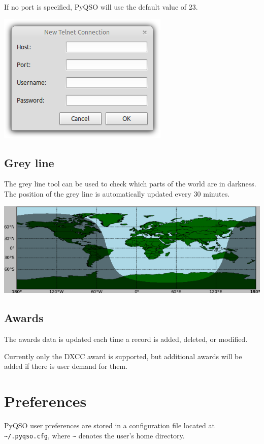 \documentclass[11pt, a4paper]{report}
\begin{document}

If no port is specified, PyQSO will use the default value of 23.

\begin{center}
  \includegraphics[width=0.5\columnwidth]{images/telnet_connection_dialog.png}
\end{center}

\section{Grey line}
The grey line tool can be used to check which parts of the world are in darkness. The position of the grey line is automatically updated every 30 minutes.

\begin{center}
  \includegraphics[width=1\columnwidth]{images/grey_line.png}
\end{center}

\section{Awards}
The awards data is updated each time a record is added, deleted, or modified. 

Currently only the DXCC award is supported, but additional awards will be added if there is user demand for them.

\chapter{Preferences}
PyQSO user preferences are stored in a configuration file located at \texttt{\textasciitilde/.pyqso.cfg}, where \texttt{\textasciitilde} denotes the user's home directory.
\end{document}
